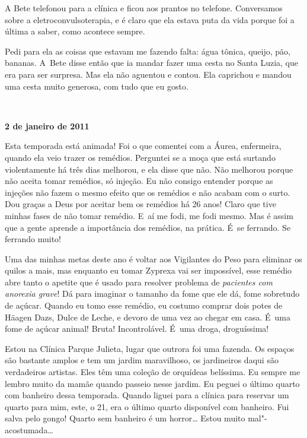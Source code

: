 A Bete telefonou para a clínica e ficou aos prantos no telefone.
Conversamos sobre a eletroconvulsoterapia, e é claro que ela estava puta
da vida porque foi a última a saber, como acontece sempre.

Pedi para ela as coisas que estavam me fazendo falta: água tônica,
queijo, pão, bananas. A~Bete disse então que ia mandar fazer uma
cesta no Santa Luzia, que era para ser surpresa. Mas ela não aguentou e
contou. Ela caprichou e mandou uma cesta muito generosa, com tudo que eu
gosto.

\begin{center}\asterisc{}​\end{center}


\begin{flushright}\textbf{2 de janeiro de 2011}\end{flushright}


Esta temporada está animada! Foi o que comentei com a Áurea, enfermeira,
quando ela veio trazer os remédios. Perguntei se a moça que está
surtando violentamente há três dias melhorou, e ela disse que não. Não
melhorou porque não aceita tomar remédios, só injeção. Eu não consigo
entender porque as injeções não fazem o mesmo efeito que os remédios e
não acabam com o surto. Dou graças a Deus por aceitar bem os remédios há
26 anos! Claro que tive minhas fases de não tomar remédio. E~aí me fodi,
me fodi mesmo. Mas é assim que a gente aprende a importância dos
remédios, na prática. É~se ferrando. Se ferrando muito!

Uma das minhas metas deste ano é voltar aos Vigilantes do Peso para
eliminar os quilos a mais, mas enquanto eu tomar Zyprexa vai ser
impossível, esse remédio abre tanto o apetite que é usado para resolver
problema de \emph{pacientes com anorexia grave}!\textbf{} Dá para
imaginar o tamanho da fome que ele dá, fome sobretudo de açúcar. Quando
eu tomo esse remédio, eu costumo comprar dois potes de Häagen Dazs,
Dulce de Leche, e devoro de uma vez ao chegar em casa. É~uma fome de
açúcar animal! Bruta! Incontrolável. É~uma droga, droguíssima!

Estou na Clínica Parque Julieta, lugar que outrora foi uma fazenda. Os
espaços são bastante amplos e tem um jardim maravilhoso, os jardineiros
daqui são verdadeiros artistas. Eles têm uma coleção de orquídeas
belíssima. Eu sempre me lembro muito da mamãe quando passeio nesse jardim.
Eu peguei o último quarto com banheiro dessa temporada. Quando liguei
para a clínica para reservar um quarto para mim, este, o 21, era o
último quarto disponível com banheiro. Fui salva pelo gongo! Quarto sem
banheiro é um horror… Estou muito mal"-acostumada…

